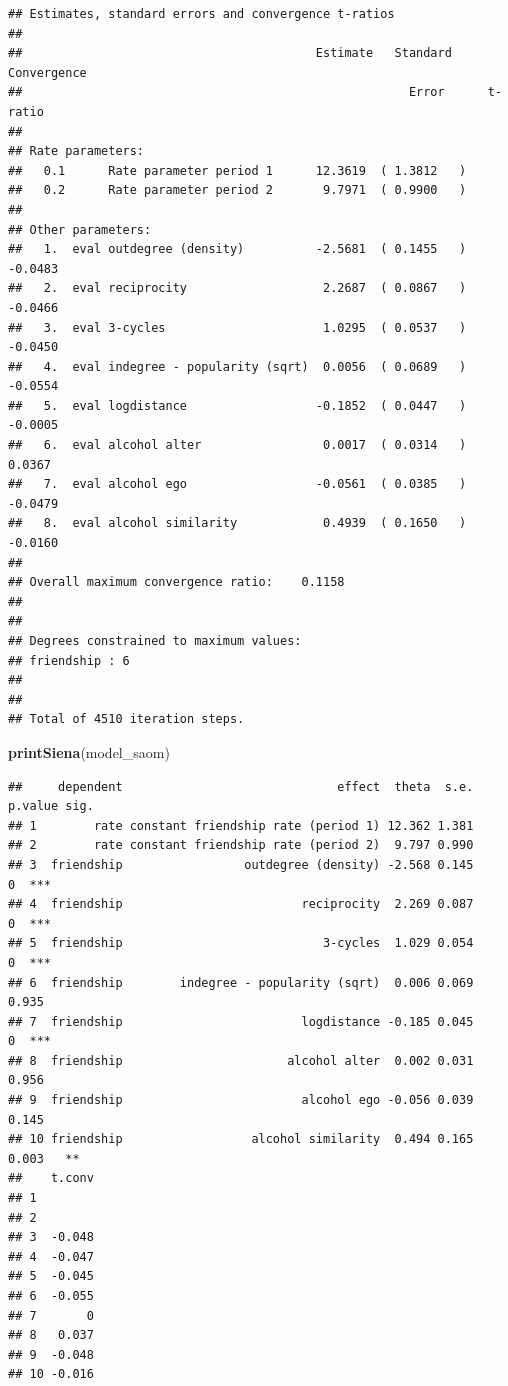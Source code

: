\documentclass[
]{article}
\newenvironment{Shaded}{\begin{snugshade}}{\end{snugshade}}
\newcommand{\FunctionTok}[1]{\textcolor[rgb]{0.13,0.29,0.53}{\textbf{#1}}}
\newcommand{\NormalTok}[1]{#1}
\begin{document}
\begin{verbatim}
## Estimates, standard errors and convergence t-ratios
## 
##                                         Estimate   Standard   Convergence 
##                                                      Error      t-ratio   
## 
## Rate parameters: 
##   0.1      Rate parameter period 1      12.3619  ( 1.3812   )             
##   0.2      Rate parameter period 2       9.7971  ( 0.9900   )             
## 
## Other parameters: 
##   1.  eval outdegree (density)          -2.5681  ( 0.1455   )   -0.0483   
##   2.  eval reciprocity                   2.2687  ( 0.0867   )   -0.0466   
##   3.  eval 3-cycles                      1.0295  ( 0.0537   )   -0.0450   
##   4.  eval indegree - popularity (sqrt)  0.0056  ( 0.0689   )   -0.0554   
##   5.  eval logdistance                  -0.1852  ( 0.0447   )   -0.0005   
##   6.  eval alcohol alter                 0.0017  ( 0.0314   )    0.0367   
##   7.  eval alcohol ego                  -0.0561  ( 0.0385   )   -0.0479   
##   8.  eval alcohol similarity            0.4939  ( 0.1650   )   -0.0160   
## 
## Overall maximum convergence ratio:    0.1158 
## 
## 
## Degrees constrained to maximum values:
## friendship : 6 
## 
## 
## Total of 4510 iteration steps.
\end{verbatim}

\begin{Shaded}
\begin{Highlighting}[]
\FunctionTok{printSiena}\NormalTok{(model\_saom)}
\end{Highlighting}
\end{Shaded}

\begin{verbatim}
##     dependent                              effect  theta  s.e. p.value sig.
## 1        rate constant friendship rate (period 1) 12.362 1.381             
## 2        rate constant friendship rate (period 2)  9.797 0.990             
## 3  friendship                 outdegree (density) -2.568 0.145       0  ***
## 4  friendship                         reciprocity  2.269 0.087       0  ***
## 5  friendship                            3-cycles  1.029 0.054       0  ***
## 6  friendship        indegree - popularity (sqrt)  0.006 0.069   0.935     
## 7  friendship                         logdistance -0.185 0.045       0  ***
## 8  friendship                       alcohol alter  0.002 0.031   0.956     
## 9  friendship                         alcohol ego -0.056 0.039   0.145     
## 10 friendship                  alcohol similarity  0.494 0.165   0.003   **
##    t.conv
## 1        
## 2        
## 3  -0.048
## 4  -0.047
## 5  -0.045
## 6  -0.055
## 7       0
## 8   0.037
## 9  -0.048
## 10 -0.016
\end{verbatim}
\end{document}
